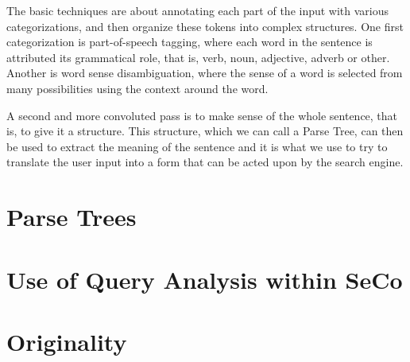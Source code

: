 The basic techniques are about annotating each part of the input with various categorizations, and then organize these tokens into complex structures. One first categorization is part-of-speech tagging, where each word in the sentence is attributed its grammatical role, that is, verb, noun, adjective, adverb or other. Another is word sense disambiguation, where the sense of a word is selected from many possibilities using the context around the word.

A second and more convoluted pass is to make sense of the whole sentence, that is, to give it a structure. This structure, which we can call a Parse Tree, can then be used to extract the meaning of the sentence and it is what we use to try to translate the user input into a form that can be acted upon by the search engine.


\section{Parse Trees} %
\label{sec:parse_trees}



\section{Use of Query Analysis within SeCo} %
\label{sec:use_of_query_analysis_within_seco}


\section{Originality} %
\label{sec:originality}


